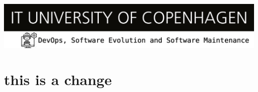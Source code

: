 \documentclass{article}
\begin{document}
  \includegraphics[width=1\linewidth]{images/devops-banner.png}
  \section{this is a change}
  
\end{document}
